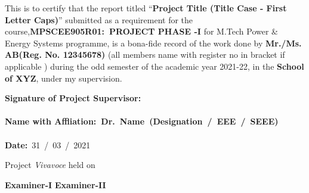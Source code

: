 \documentclass[a4paper, 12pt, oneside]{sastra}
\begin{document}

\newpage

\setcounter{page}{2}

\certificate


\begin{doublespace}
	\linespread{2}
	
	This is to certify that the report titled ``\textbf{Project Title (Title Case - First Letter Caps)}'' submitted as a requirement for the course,{\textbf{MPSCEE905R01:~PROJECT PHASE -I}} for M.Tech Power \& Energy Systems programme, is a bona-fide record of the work done by \textbf{Mr./Ms. AB(Reg. No. 12345678)} (all members name with register no in bracket if applicable ) during the odd semester of the academic year 2021-22, in the \textbf{School of XYZ}, under my supervision.
	
\end{doublespace}
\vspace*{0.4in}

\noindent\textbf{Signature of Project Supervisor:}~	\\ %
\\
\textbf{Name with Affliation\hspace*{19mm}:~\textbf{Dr.~Name}~(Designation~/~EEE~/~SEEE)}	\\
\\
\textbf{Date\hspace*{48.25mm}:}~31~/~03~/~2021\\%

\vspace*{0.35in}

\noindent Project \textit{Vivavoce} held on

\vspace*{0.50in}
\noindent \textbf{Examiner-I} \hspace*{120mm} \textbf{Examiner-II}


\declaration

\end{document}
